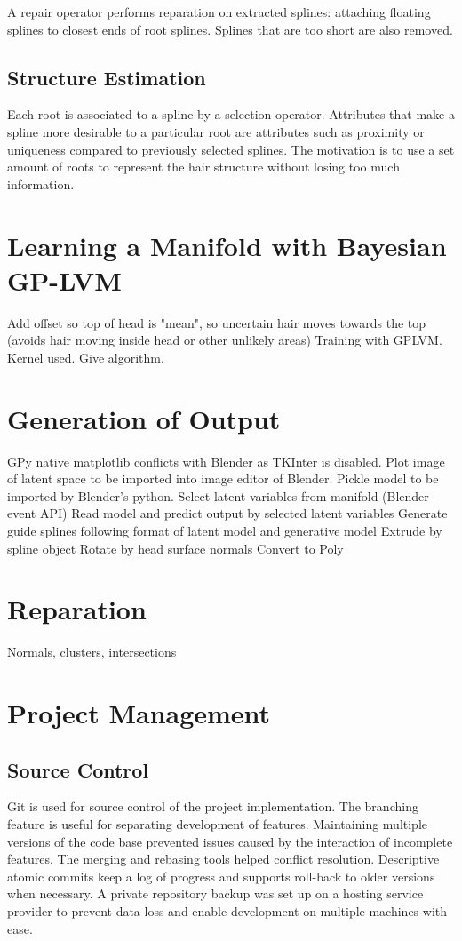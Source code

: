 \documentclass[ %
                    author={Dillon Keith Diep [INCOMPLETE DRAFT, NOT FOR SUBMISSION]},
                supervisor={Dr. Carl Henrik Ek},
                    degree={MEng},
                     title={ARt-CG:},
                  subtitle={Assisted Real-time Content Generation of 3D Hair by Learning Manifolds},
                      type={Research},
                      year={2014} ]{dissertation}
\begin{document}
A repair operator performs reparation on extracted splines: attaching floating splines to closest ends of root splines. Splines that are too short are also removed.

\subsection{Structure Estimation}
Each root is associated to a spline by a selection operator. Attributes that make a spline more desirable to a particular root are attributes such as proximity or uniqueness compared to previously selected splines. The motivation is to use a set amount of roots to represent the hair structure without losing too much information.

\section{Learning a Manifold with Bayesian GP-LVM}
Add offset so top of head is "mean", so uncertain hair moves towards the top (avoids hair moving inside head or other unlikely areas)
Training with GPLVM.
Kernel used.
Give algorithm.

\section{Generation of Output}
GPy native matplotlib conflicts with Blender as TKInter is disabled.
Plot image of latent space to be imported into image editor of Blender.
Pickle model to be imported by Blender's python.
Select latent variables from manifold (Blender event API)
Read model and predict output by selected latent variables
Generate guide splines following format of latent model and generative model
Extrude by spline object
Rotate by head surface normals
Convert to Poly

\section{Reparation}
Normals, clusters, intersections

\section{Project Management}
\subsection{Source Control}
Git is used for source control of the project implementation. The branching feature is useful for separating development of features. Maintaining multiple versions of the code base prevented issues caused by the interaction of incomplete features. The merging and rebasing tools helped conflict resolution. Descriptive atomic commits keep a log of progress and supports roll-back to older versions when necessary. A private repository backup was set up on a hosting service provider to prevent data loss and enable development on multiple machines with ease.
\end{document}
